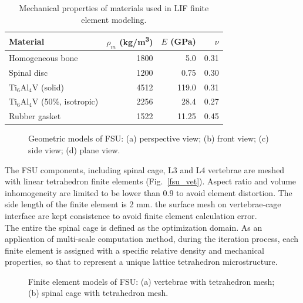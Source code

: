 \documentclass[12pt]{extbook}
\begin{document}
\begin{table}[htbp]
\centering
\caption{Mechanical properties of materials used in LIF finite element modeling.}
\begin{tabular}{lrrr}
\hline\hline
Material & $\rho_m$ (kg/m\textsuperscript{3}) & $E$ (GPa) & $\nu$\\
\hline
Homogeneous bone & 1800 & 5.0 & 0.31\\
Spinal disc & 1200 & 0.75 & 0.30\\
$\text{Ti}_6\text{Al}_4\text{V}$ (solid) & 4512 & 119.0 & 0.31\\
$\text{Ti}_6\text{Al}_4\text{V}$ (50\%, isotropic)& 2256 & 28.4 & 0.27\\
Rubber gasket & 1522 & 11.25 & 0.45\\
\hline\hline
\end{tabular}
\label{property_spine}
\end{table}

\begin{figure}[htbp]
\centering
{}
\caption{Geometric models of FSU: (a) perspective view; (b) front view; (c) side view; (d) plane view.}
\label{fsu_model}
\end{figure}

The FSU components, including spinal cage, L3 and L4 vertebrae are meshed with linear tetrahedron finite elements (Fig.~\ref{fsu_vet}). Aspect ratio and volume inhomogeneity are limited to be lower than 0.9 to avoid element distortion. The side length of the finite element is 2 mm. the surface mesh on vertebrae-cage interface are kept consistence to avoid finite element calculation error.\\

The entire the spinal cage is defined as the optimization domain. As an application of multi-scale computation method, during the iteration process, each finite element is assigned with a specific relative density and mechanical properties, so that to represent a unique lattice tetrahedron microstructure.\\

\begin{figure}[htbp]
\centering
{}
\caption{Finite element models of FSU: (a) vertebrae with tetrahedron mesh; (b) spinal cage with tetrahedron mesh.}
\label{fsu_mesh}
\end{figure}
\end{document}
